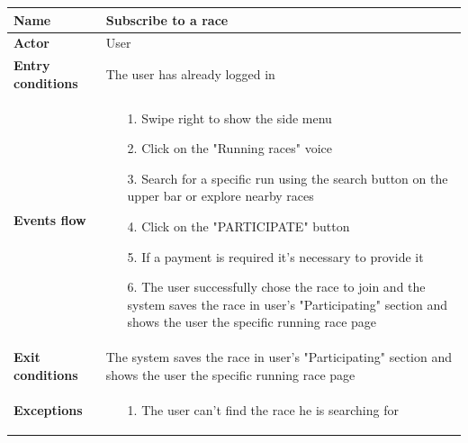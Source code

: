 \begin{table}[]
\begin{adjustbox}{width=\textwidth}
\footnotesize
\begin{tabular}{|p{}|p{}|}
\hline
\textbf{Name}             &  Subscribe to a race\\ \hline
\textbf{Actor}            &  User\\ \hline
\textbf{Entry conditions} &  The user has already logged in\\ \hline
\textbf{Events flow}      &
	\begin{itemize}
		\item[1.] Swipe right to show the side menu
		\item[2.] Click on the "Running races" voice
		\item[3.] Search for a specific run using the search button on the upper bar or explore nearby races
		\item[4.] Click on the "PARTICIPATE" button
		\item[5.] If a payment is required it's necessary to provide it
		\item[6.] The user successfully chose the race to join and the system saves the race in user's "Participating" section and shows the user the specific running race page
	\end{itemize}\\ \hline
\textbf{Exit conditions}  &  The system saves the race in user's "Participating" section and shows the user the specific running race page\\ \hline
\textbf{Exceptions}       &
	\begin{itemize}
		\item[1.] The user can't find the race he is searching for
	\end{itemize}\\ \hline
\end{tabular}
\end{adjustbox}
\end{table}

